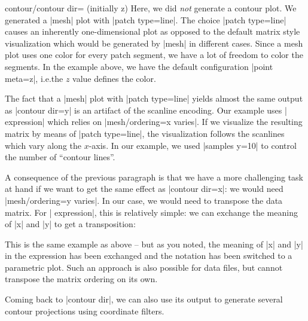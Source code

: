 {{\begin{pgfplotskey}{contour/contour dir= (initially z)}
    Here, we did \emph{not} generate a contour plot. We generated a |mesh| plot
    with |patch type=line|. The choice |patch type=line| causes an inherently
    one-dimensional plot as opposed to the default matrix style visualization
    which would be generated by |mesh| in different
    cases. Since a mesh
    plot uses one color for every patch segment, we have a lot of freedom to
    color the segments. In the example above, we have the default configuration
    |point meta=z|, i.e.\@ the $z$ value defines the color.

    The fact that a |mesh| plot with |patch type=line| yields almost the same
    output as |contour dir=y| is an artifact of the scanline encoding. Our
    example uses | expression| which relies on
    |mesh/ordering=x varies|. If we visualize the resulting matrix by means of
    |patch type=line|, the visualization follows the scanlines which vary along
    the $x$-axis. In our example, we used |samples y=10| to control the number
    of ``contour lines''.

    A consequence of the previous paragraph is that we have a more challenging
    task at hand if we want to get the same effect as |contour dir=x|: we would
    need |mesh/ordering=y varies|. In our case, we would need to transpose the
    data matrix. For | expression|, this is relatively simple: we can
    exchange the meaning of |x| and |y| to get a transposition:

\pgfplotsexpensiveexample
\begin{codeexample}[]
\end{codeexample}
    This is the same example as above -- but as you noted, the meaning of |x|
    and |y| in the expression has been exchanged and the notation has been
    switched to a parametric plot. Such an approach is also possible for data
    files, but \PGFPlots{} cannot transpose the matrix ordering on its own.


    Coming back to |contour dir|, we can also use its output to generate
    several contour projections using coordinate filters.
\pgfplotsexpensiveexample
\begin{codeexample}[]
\end{codeexample}
\end{pgfplotskey}}}
